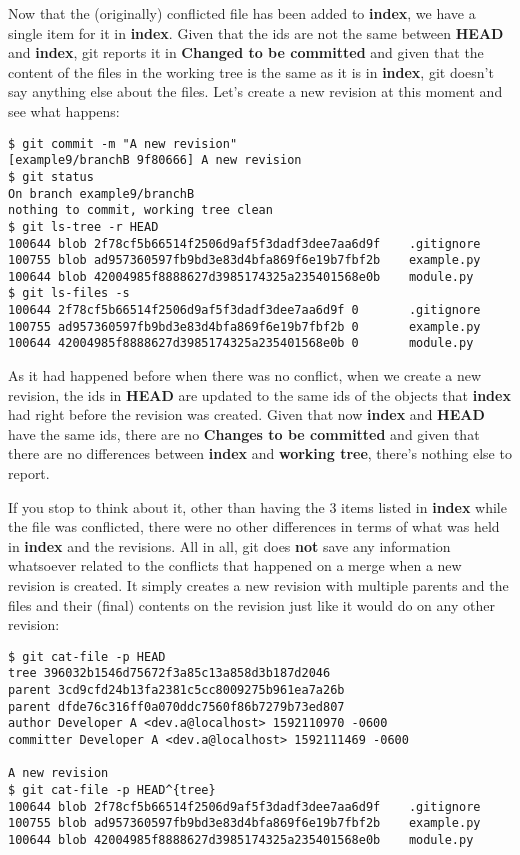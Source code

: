 Now that the (originally) conflicted file has been added to {\bf index}, we have a single item for it in {\bf index}. Given that
the ids are not the same between {\bf HEAD} and {\bf index}, git reports it in {\bf Changed to be committed} and given that the
content of the files in the working tree is the same as it is in {\bf index}, git doesn't say anything else about the files. Let's
create a new revision at this moment and see what happens:

\begin{lstlisting}[style=console_style,
	basicstyle=\small,
	caption=Committing after conflict]
$ git commit -m "A new revision"
[example9/branchB 9f80666] A new revision
$ git status
On branch example9/branchB
nothing to commit, working tree clean
$ git ls-tree -r HEAD
100644 blob 2f78cf5b66514f2506d9af5f3dadf3dee7aa6d9f    .gitignore
100755 blob ad957360597fb9bd3e83d4bfa869f6e19b7fbf2b    example.py
100644 blob 42004985f8888627d3985174325a235401568e0b    module.py
$ git ls-files -s
100644 2f78cf5b66514f2506d9af5f3dadf3dee7aa6d9f 0       .gitignore
100755 ad957360597fb9bd3e83d4bfa869f6e19b7fbf2b 0       example.py
100644 42004985f8888627d3985174325a235401568e0b 0       module.py
\end{lstlisting}

As it had happened before when there was no conflict, when we create a new revision, the ids in {\bf HEAD} are updated to the
same ids of the objects that {\bf index} had right before the revision was created. Given that now {\bf index} and {\bf HEAD} have
the same ids, there are no {\bf Changes to be committed} and given that there are no differences between {\bf index} and
{\bf working tree}, there's nothing else to report.

If you stop to think about it, other than having the 3 items listed in {\bf index} while the file was conflicted, there were no
other differences in terms of what was held in {\bf index} and the revisions. All in all, git does {\bf not} save any information
whatsoever related to the conflicts that happened on a merge when a new revision is created. It simply creates a new revision with
multiple parents and the files and their (final) contents on the revision just like it would do on any other revision:

\begin{lstlisting}[style=console_style,
	basicstyle=\small,
	caption=Checking revision information]
$ git cat-file -p HEAD
tree 396032b1546d75672f3a85c13a858d3b187d2046
parent 3cd9cfd24b13fa2381c5cc8009275b961ea7a26b
parent dfde76c316ff0a070ddc7560f86b7279b73ed807
author Developer A <dev.a@localhost> 1592110970 -0600
committer Developer A <dev.a@localhost> 1592111469 -0600

A new revision
$ git cat-file -p HEAD^{tree}
100644 blob 2f78cf5b66514f2506d9af5f3dadf3dee7aa6d9f    .gitignore
100755 blob ad957360597fb9bd3e83d4bfa869f6e19b7fbf2b    example.py
100644 blob 42004985f8888627d3985174325a235401568e0b    module.py
\end{lstlisting}

